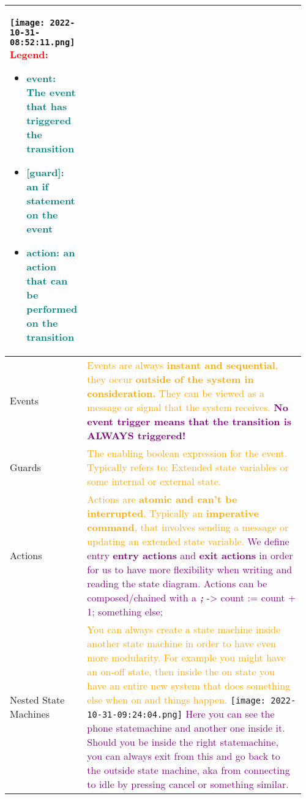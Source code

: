 \documentclass[main.tex,fontsize=8pt,paper=a4,paper=portrait,DIV=calc,]{scrartcl}
\begin{document}
\begin{table}[ht!]
\begin{tabular}{|m{0.2\linewidth}|m{0.755\linewidth}|}
\texttt{[image: 2022-10-31-08:52:11.png]}\newline
\textcolor{red}{Legend:}\newline
\begin{itemize}
\item \textcolor{teal}{event: The event that has triggered the transition}
\item \textcolor{teal}{[guard]: an if statement on the event}
\item \textcolor{teal}{action: an action that can be performed on the transition}
\vspace{-3mm}
\end{itemize}\\
\hline
Events & 
\textcolor{orange}{Events are always \textbf{instant and sequential}, they occur \textbf{outside of the system in consideration.}\newline
They can be viewed as a message or signal that the system receives.}\newline
\textcolor{purple}{\textbf{No event trigger means that the transition is ALWAYS triggered!}}\\
\hline
Guards & 
\textcolor{orange}{The enabling boolean expression for the event.\newline
Typically refers to: \newline
Extended state variables or some internal or external state.}
\\
\hline
Actions & 
\textcolor{orange}{Actions are \textbf{atomic and can't be interrupted}.\newline
Typically an \textbf{imperative command}, that involves sending a message or updating an extended state variable.}\newline
\textcolor{purple}{We define entry \textbf{entry actions} and \textbf{exit actions} in order for us to have more flexibility when writing and reading the state diagram.\newline
Actions can be composed/chained with a \textbf{\textit{;}} -> count := count + 1; something else;}\\
\hline
Nested State Machines & 
\textcolor{orange}{You can always create a state machine inside another state machine in order to have even more modularity.\newline
For example you might have an on-off state, then inside the on state you have an entire new system that does something else when on and things happen.}\newline
\texttt{[image: 2022-10-31-09:24:04.png]}\newline
\textcolor{purple}{Here you can see the phone statemachine and another one inside it.\newline
Should you be inside the right statemachine, you can always exit from this and go back to the outside state machine, aka from connecting to idle by pressing cancel or something similar.}\\
\hline
\end{tabular}
\end{table}
\end{document}
